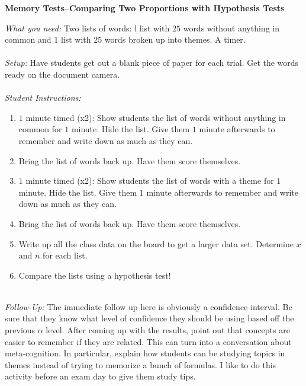 \documentclass[12pt]{amsart}
\theoremstyle{definition}
\begin{document}
      \begin{framed}
      	\begin{center} \textbf{Memory Tests--Comparing Two Proportions with Hypothesis Tests} \end{center}
      	\emph{What you need:} Two lists of words: l list with $25$ words without anything in common and 1 list with $25$ words broken up into themes. A timer.\\
      	~\\
      	\emph{Setup:} Have students get out a blank piece of paper for each trial. Get the words ready on the document camera.\\
      	~\\
      	\emph{Student Instructions:} 
      	\begin{enumerate}
      		\item $1$ minute timed (x2): Show students the list of words without anything in common for $1$ minute. Hide the list. Give them $1$ minute afterwards to remember and write down as much as they can.
      		\item Bring the list of words back up. Have them score themselves.
      		\item $1$ minute timed (x2): Show students the list of words with a theme for $1$ minute. Hide the list. Give them $1$ minute afterwards to remember and write down as much as they can.
      		\item Bring the list of words back up. Have them score themselves.
      		\item Write up all the class data on the board to get a larger data set. Determine $x$ and $n$ for each list.
      		\item Compare the lists using a hypothesis test!
      	\end{enumerate}
      	~\\
      	\emph{Follow-Up:} The immediate follow up here is obviously a confidence interval. Be sure that they know what level of confidence they should be using based off the previous $\alpha$ level. After coming up with the results, point out that concepts are easier to remember if they are related. This can turn into a conversation about meta-cognition. In particular, explain how students can be studying topics in themes instead of trying to memorize a bunch of formulas. I like to do this activity before an exam day to give them study tips.
      \end{framed}
  
   \newpage
   
\end{document}
